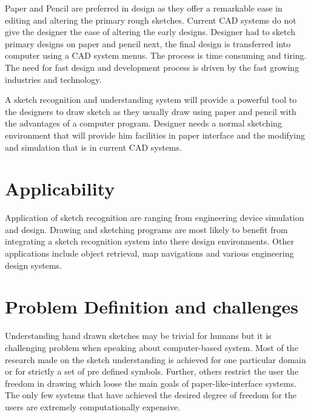  Paper and Pencil are preferred in design as they offer a remarkable ease in editing and altering the primary rough sketches. Current CAD systems do not give the designer the ease of altering the early designs. Designer had to sketch primary designs on paper and pencil next, the final design is transferred into computer using a CAD system menus. The process is time consuming and tiring. The need for fast design and development process is driven by the fast growing industries and technology.
 
 A sketch recognition and understanding system will provide a powerful tool to the designers to draw sketch as they usually draw using paper and pencil with the advantages of a computer program. Designer needs a normal sketching environment that will provide him facilities in paper interface and the modifying and simulation that is in current CAD systems. 
 
\section{Applicability }
Application of sketch recognition are ranging from engineering device simulation and design. Drawing and sketching programs are most likely to benefit from integrating a sketch recognition system into there design environments. Other applications include object retrieval, map navigations and various engineering design systems.

 



\section{Problem Definition and challenges}
\label{sec:ProblemsAndChallenges}

 Understanding hand drawn sketches may be trivial for humans but it is challenging problem when speaking about computer-based system. Most of the research made on the sketch understanding is achieved for one particular domain or for strictly a set of pre defined symbols. Further, others restrict the user the freedom in drawing which loose the main goals of paper-like-interface systems. The only few systems that have achieved the desired degree of freedom for the users are extremely computationally expensive.
 
